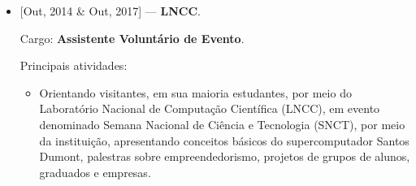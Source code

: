 \begin{itemize}
  \item {[Out, 2014 \& Out, 2017]} --- \textbf{LNCC}.

    Cargo: \textbf{Assistente Voluntário de Evento}.

    Principais atividades:

    \vspace{-0.5em}
    \begin{itemize}
      \item Orientando visitantes, em sua maioria estudantes, por meio do
        Laboratório Nacional de Computação Científica (LNCC), em evento
        denominado Semana Nacional de Ciência e Tecnologia (SNCT), por meio
        da instituição, apresentando conceitos básicos do supercomputador
        Santos Dumont, palestras sobre empreendedorismo, projetos de
        grupos de alunos, graduados e empresas.
    \end{itemize}
\end{itemize}
